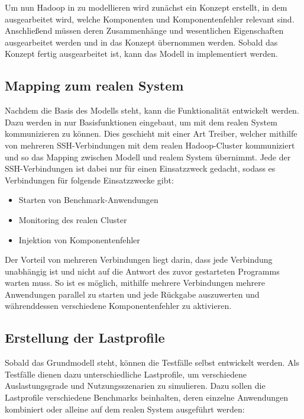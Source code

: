 Um nun Hadoop in \sS zu modellieren wird zunächst ein Konzept erstellt, in dem ausgearbeitet wird, welche Komponenten und Komponentenfehler relevant sind. Anschließend müssen deren Zusammenhänge und wesentlichen Eigenschaften ausgearbeitet werden und in das Konzept übernommen werden. Sobald das Konzept fertig ausgearbeitet ist, kann das Modell in \sS implementiert werden.

\subsection{Mapping zum realen System}\label{sec:mapping}

Nachdem die Basis des Modells steht, kann die Funktionalität entwickelt werden. Dazu werden in \sS nur Basisfunktionen eingebaut, um mit dem realen System kommunizieren zu können. Dies geschieht mit einer Art Treiber, welcher mithilfe von mehreren SSH-Verbindungen mit dem realen Hadoop-Cluster kommuniziert und so das Mapping zwischen Modell und realem System übernimmt. Jede der SSH-Verbindungen ist dabei nur für einen Einsatzzweck gedacht, sodass es Verbindungen für \uA folgende Einsatzzwecke gibt:

\begin{itemize}[noitemsep]
	\item Starten von Benchmark-Anwendungen
	\item Monitoring des realen Cluster
	\item Injektion von Komponentenfehler
\end{itemize}

Der Vorteil von mehreren Verbindungen liegt darin, dass jede Verbindung unabhängig ist und nicht auf die Antwort des zuvor gestarteten Programms warten muss. So ist es möglich, mithilfe mehrere Verbindungen mehrere Anwendungen parallel zu starten und jede Rückgabe auszuwerten und währenddessen verschiedene Komponentenfehler zu aktivieren.

\subsection{Erstellung der Lastprofile}\label{sec:lastprofilerstellung}

Sobald das Grundmodell steht, können die Testfälle selbst entwickelt werden. Als Testfälle dienen dazu unterschiedliche Lastprofile, um verschiedene Auslastungsgrade und Nutzungsszenarien zu simulieren. Dazu sollen die Lastprofile verschiedene Benchmarks beinhalten, deren einzelne Anwendungen kombiniert oder alleine auf dem realen System ausgeführt werden:


